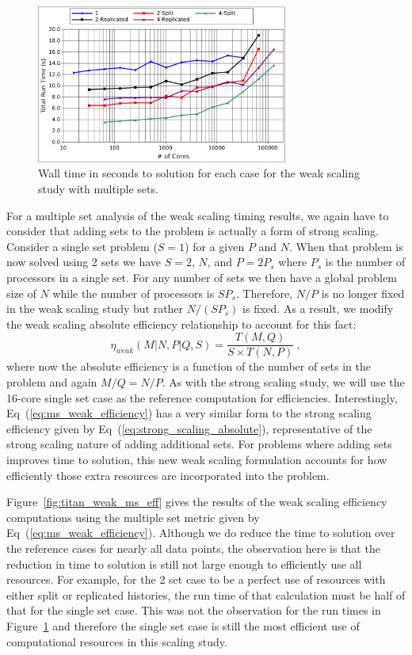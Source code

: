 \documentclass{snamc2013}
\begin{document}
\begin{figure}[H]
  \begin{center}
    \includegraphics[width=3.25in]{titan_weak_ms_time.pdf}
  \end{center}
  \caption{Wall time in seconds to solution for each case for the weak
    scaling study with multiple sets.}
  \label{fig:titan_weak_ms_time}
\end{figure}

For a multiple set analysis of the weak scaling timing results, we
again have to consider that adding sets to the problem is actually a
form of strong scaling. Consider a single set problem ($S=1$) for a
given $P$ and $N$. When that problem is now solved using 2 sets we
have $S=2$, $N$, and $P=2P_s$ where $P_s$ is the number of processors in
a single set. For any number of sets we then have a global problem
size of $N$ while the number of processors is $SP_s$. Therefore,
$N/P$ is no longer fixed in the weak scaling study but rather
$N/(SP_s)$ is fixed. As a result, we modify the weak scaling absolute
efficiency relationship to account for this fact:
\begin{equation}
\eta_{weak}(M|N,P|Q,S) = \frac{T(M,Q)}{S \times T(N,P)}\:,
  \label{eq:ms_weak_efficiency}
\end{equation}
where now the absolute efficiency is a function of the number of sets
in the problem and again $M/Q = N/P$. As with the strong scaling
study, we will use the 16-core single set case as the reference
computation for efficiencies. Interestingly,
Eq~(\ref{eq:ms_weak_efficiency}) has a very similar form to the strong
scaling efficiency given by Eq~(\ref{eq:strong_scaling_absolute}),
representative of the strong scaling nature of adding additional
sets. For problems where adding sets improves time to solution, this
new weak scaling formulation accounts for how efficiently those extra
resources are incorporated into the problem.

Figure~\ref{fig:titan_weak_ms_eff} gives the results of the weak
scaling efficiency computations using the multiple set metric given by
Eq~(\ref{eq:ms_weak_efficiency}). Although we do reduce the time to
solution over the reference cases for nearly all data points, the
observation here is that the reduction in time to solution is still
not large enough to efficiently use all resources. For example, for
the 2 set case to be a perfect use of resources with either split or
replicated histories, the run time of that calculation must be half of
that for the single set case. This was not the observation for the run
times in Figure~\ref{fig:titan_weak_ms_time} and therefore the single
set case is still the most efficient use of computational resources in
this scaling study.
\end{document}
